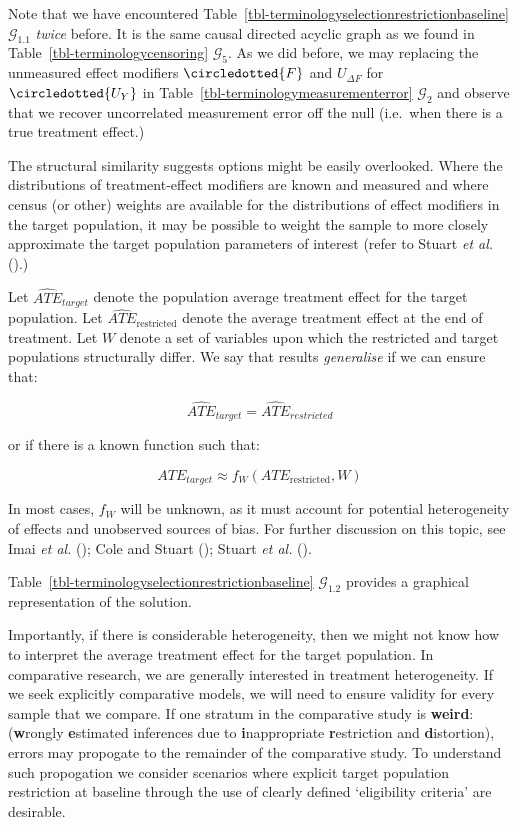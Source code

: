 \documentclass[
  single column]{article}
\begin{document}
Note that we have encountered
Table~\ref{tbl-terminologyselectionrestrictionbaseline}
\(\mathcal{G}_{1.1}\) \emph{twice} before. It is the same causal
directed acyclic graph as we found in
Table~\ref{tbl-terminologycensoring} \(\mathcal{G}_5\). As we did
before, we may replacing the unmeasured effect modifiers
\(\circledotted{F}\) and \(U_{\Delta F}\) for \(\circledotted{U_Y}\) in
Table~\ref{tbl-terminologymeasurementerror} \(\mathcal{G}_2\) and
observe that we recover uncorrelated measurement error off the null
(i.e.~when there is a true treatment effect.)

The structural similarity suggests options might be easily overlooked.
Where the distributions of treatment-effect modifiers are known and
measured and where census (or other) weights are available for the
distributions of effect modifiers in the target population, it may be
possible to weight the sample to more closely approximate the target
population parameters of interest (refer to Stuart \emph{et al.}
().)

Let \(\widehat{ATE}_{target}\) denote the population average treatment
effect for the target population. Let
\(\widehat{ATE}_{\text{restricted}}\) denote the average treatment
effect at the end of treatment. Let \(W\) denote a set of variables upon
which the restricted and target populations structurally differ. We say
that results \emph{generalise} if we can ensure that:

\[
\widehat{ATE}_{target} = \widehat{ATE}_{restricted}
\]

or if there is a known function such that:

\[
ATE_{target} \approx f_W(ATE_{\text{restricted}}, W)
\]

In most cases, \(f_W\) will be unknown, as it must account for potential
heterogeneity of effects and unobserved sources of bias. For further
discussion on this topic, see Imai \emph{et al.}
(); Cole and Stuart
(); Stuart \emph{et al.}
().

Table~\ref{tbl-terminologyselectionrestrictionbaseline}
\(\mathcal{G}_{1.2}\) provides a graphical representation of the
solution.

Importantly, if there is considerable heterogeneity, then we might not
know how to interpret the average treatment effect for the target
population. In comparative research, we are generally interested in
treatment heterogeneity. If we seek explicitly comparative models, we
will need to ensure validity for every sample that we compare. If one
stratum in the comparative study is \textbf{weird}: (\textbf{w}rongly
\textbf{e}stimated inferences due to \textbf{i}nappropriate
\textbf{r}estriction and \textbf{d}istortion), errors may propogate to
the remainder of the comparative study. To understand such propogation
we consider scenarios where explicit target population restriction at
baseline through the use of clearly defined `eligibility criteria' are
desirable.
\end{document}

